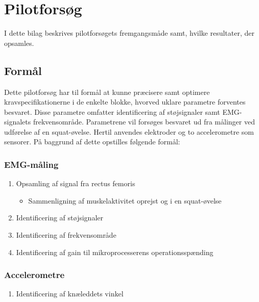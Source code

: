 \section{Pilotforsøg} 
\label{sec:pilotforsoeg}
I dette bilag beskrives pilotforsøgets fremgangsmåde samt, hvilke resultater, der opsamles. 

\subsection{Formål}
Dette pilotforsøg har til formål at kunne præcisere samt optimere kravspecifikationerne i de enkelte blokke, hvorved uklare parametre forventes besvaret. Disse parametre omfatter identificering af støjsignaler samt EMG-signalets frekvensområde. Parametrene vil forsøges besvaret ud fra målinger ved udførelse af en squat-øvelse.
Hertil anvendes elektroder og to accelerometre som sensorer. På baggrund af dette opstilles følgende formål:  

\subsubsection{EMG-måling}
\begin{enumerate}
\item Opsamling af signal fra rectus femoris %
\begin{itemize}
\item Sammenligning af muskelaktivitet oprejst og i en squat-øvelse 
\end{itemize}
\item Identificering af støjsignaler
\item Identificering af frekvensområde
\item Identificering af gain til mikroprocesserens operationsspænding 
\end{enumerate}

\subsubsection{Accelerometre}
\begin{enumerate}
\item Identificering af knæleddets vinkel
\end{enumerate}

